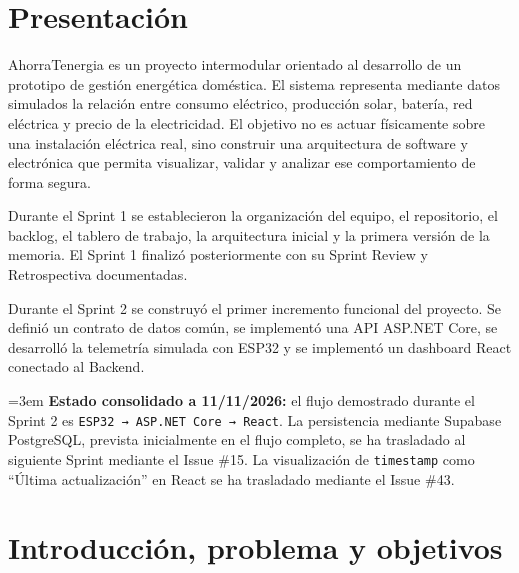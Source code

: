 \documentclass[11pt,a4paper,oneside]{report}
\newcommand{\important}[1]{%
  \par\vspace{5pt}\noindent
  \colorbox{mint}{%
    \parbox{0.89\linewidth}{%
      \vspace{6pt}\small\RaggedRight\emergencystretch=3em #1\vspace{6pt}%
    }%
  }%
  \vspace{5pt}%
}
\begin{document}
\tableofcontents
\clearpage


\chapter*{Presentación}

AhorraTenergia es un proyecto intermodular orientado al desarrollo de un prototipo de gestión energética doméstica. El sistema representa mediante datos simulados la relación entre consumo eléctrico, producción solar, batería, red eléctrica y precio de la electricidad. El objetivo no es actuar físicamente sobre una instalación eléctrica real, sino construir una arquitectura de software y electrónica que permita visualizar, validar y analizar ese comportamiento de forma segura.

Durante el Sprint 1 se establecieron la organización del equipo, el repositorio, el backlog, el tablero de trabajo, la arquitectura inicial y la primera versión de la memoria. El Sprint 1 finalizó posteriormente con su Sprint Review y Retrospectiva documentadas.

Durante el Sprint 2 se construyó el primer incremento funcional del proyecto. Se definió un contrato de datos común, se implementó una API ASP.NET Core, se desarrolló la telemetría simulada con ESP32 y se implementó un dashboard React conectado al Backend.

\important{\textbf{Estado consolidado a 11/11/2026:} el flujo demostrado durante el Sprint 2 es \texttt{ESP32 → ASP.NET Core → React}. La persistencia mediante Supabase PostgreSQL, prevista inicialmente en el flujo completo, se ha trasladado al siguiente Sprint mediante el Issue \#15. La visualización de \texttt{timestamp} como ``Última actualización'' en React se ha trasladado mediante el Issue \#43.}

\clearpage
{}


\chapter{Introducción, problema y objetivos}
\end{document}
